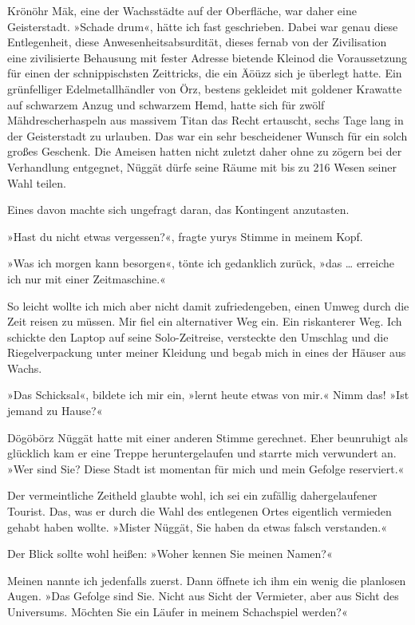 Krönöhr Mäk, eine der Wachsstädte auf der Oberfläche, war daher eine Geisterstadt. »Schade drum«, hätte ich fast geschrieben. Dabei war genau diese Entlegenheit, diese Anwesenheitsabsurdität, dieses fernab von der Zivilisation eine zivilisierte Behausung mit fester Adresse bietende Kleinod die Voraussetzung für einen der schnippischsten Zeittricks, die ein Äöüzz sich je überlegt hatte. Ein grünfelliger Edelmetallhändler von Örz, bestens gekleidet mit goldener Krawatte auf schwarzem Anzug und schwarzem Hemd, hatte sich für zwölf Mähdrescherhaspeln aus massivem Titan das Recht ertauscht, sechs Tage lang in der Geisterstadt zu urlauben. Das war ein sehr bescheidener Wunsch für ein solch großes Geschenk. Die Ameisen hatten nicht zuletzt daher ohne zu zögern bei der Verhandlung entgegnet, Nüggät dürfe seine Räume mit bis zu 216 Wesen seiner Wahl teilen.

Eines davon machte sich ungefragt daran, das Kontingent anzutasten.

»Hast du nicht etwas vergessen?«, fragte yurys Stimme in meinem Kopf.

»Was ich morgen kann besorgen«, tönte ich gedanklich zurück, »das … erreiche ich nur mit einer Zeitmaschine.«

So leicht wollte ich mich aber nicht damit zufriedengeben, einen Umweg durch die Zeit reisen zu müssen. Mir fiel ein alternativer Weg ein. Ein riskanterer Weg. Ich schickte den Laptop auf seine Solo-Zeitreise, versteckte den Umschlag und die Riegelverpackung unter meiner Kleidung und begab mich in eines der Häuser aus Wachs.

»Das Schicksal«, bildete ich mir ein, »lernt heute etwas von mir.« Nimm das! »Ist jemand zu Hause?«

Dögöbörz Nüggät hatte mit einer anderen Stimme gerechnet. Eher beunruhigt als glücklich kam er eine Treppe heruntergelaufen und starrte mich verwundert an. »Wer sind Sie? Diese Stadt ist momentan für mich und mein Gefolge reserviert.«

Der vermeintliche Zeitheld glaubte wohl, ich sei ein zufällig dahergelaufener Tourist. Das, was er durch die Wahl des entlegenen Ortes eigentlich vermieden gehabt haben wollte. »Mister Nüggät, Sie haben da etwas falsch verstanden.«

Der Blick sollte wohl heißen: »Woher kennen Sie meinen Namen?«

Meinen nannte ich jedenfalls zuerst. Dann öffnete ich ihm ein wenig die planlosen Augen. »Das Gefolge sind Sie. Nicht aus Sicht der Vermieter, aber aus Sicht des Universums. Möchten Sie ein Läufer in meinem Schachspiel werden?«

